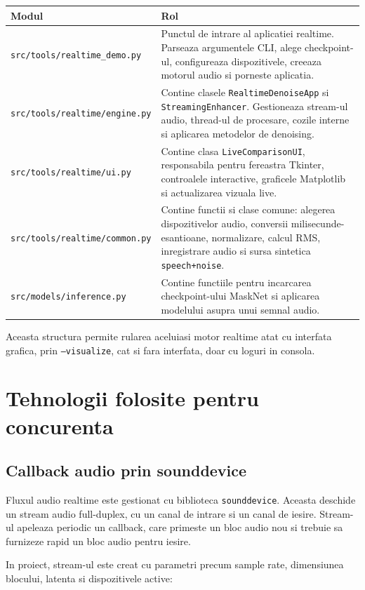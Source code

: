\documentclass[12pt,a4paper]{article}
\begin{document}
\begin{longtable}{p{}p{}}
\toprule
\textbf{Modul} & \textbf{Rol} \\
\midrule
\endhead
\texttt{src/tools/realtime\_demo.py} &
Punctul de intrare al aplicatiei realtime. Parseaza argumentele CLI, alege
checkpoint-ul, configureaza dispozitivele, creeaza motorul audio si porneste
aplicatia. \\
\addlinespace
\texttt{src/tools/realtime/engine.py} &
Contine clasele \texttt{RealtimeDenoiseApp} si \texttt{StreamingEnhancer}.
Gestioneaza stream-ul audio, thread-ul de procesare, cozile interne si aplicarea
metodelor de denoising. \\
\addlinespace
\texttt{src/tools/realtime/ui.py} &
Contine clasa \texttt{LiveComparisonUI}, responsabila pentru fereastra Tkinter,
controalele interactive, graficele Matplotlib si actualizarea vizuala live. \\
\addlinespace
\texttt{src/tools/realtime/common.py} &
Contine functii si clase comune: alegerea dispozitivelor audio, conversii
milisecunde-esantioane, normalizare, calcul RMS, inregistrare audio si sursa
sintetica \texttt{speech+noise}. \\
\addlinespace
\texttt{src/models/inference.py} &
Contine functiile pentru incarcarea checkpoint-ului MaskNet si aplicarea
modelului asupra unui semnal audio. \\
\bottomrule
\end{longtable}

Aceasta structura permite rularea aceluiasi motor realtime atat cu interfata
grafica, prin \texttt{--visualize}, cat si fara interfata, doar cu loguri in
consola.

\section{Tehnologii folosite pentru concurenta}

\subsection{Callback audio prin sounddevice}

Fluxul audio realtime este gestionat cu biblioteca \texttt{sounddevice}. Aceasta
deschide un stream audio full-duplex, cu un canal de intrare si un canal de
iesire. Stream-ul apeleaza periodic un callback, care primeste un bloc audio nou
si trebuie sa furnizeze rapid un bloc audio pentru iesire.

In proiect, stream-ul este creat cu parametri precum sample rate, dimensiunea
blocului, latenta si dispozitivele active:
\end{document}
